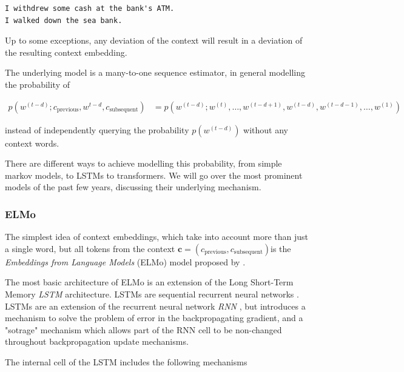 \documentclass[a4paper,12pt,twoside,openright]{report}
\begin{document}
\begin{verbatim}
I withdrew some cash at the bank's ATM.
I walked down the sea bank.
\end{verbatim}

Up to some exceptions, any deviation of the context will result in a deviation of the resulting context embedding.


The underlying model is a many-to-one sequence estimator, in general modelling the probability of 

\begin{align}
p(w^{(t-d)}; c_\text{previous}, w^{t-d}, c_\text{subsequent}) &= p(w^{(t-d)}; w^{(t)}, \ldots, w^{(t-d + 1)}, w^{(t-d)}, w^{(t-d - 1)}, \ldots, w^{(1)})
\end{align}{\label{eq:transformer_probability}}

instead of independently querying the probability $p(w^{(t-d)})$ without any context words.

There are different ways to achieve modelling this probability, from simple markov models, to LSTMs to transformers.
We will go over the most prominent models of the past few years, discussing their underlying mechanism.

\subsubsection{ELMo}

The simplest idea of context embeddings, which take into account more than just a single word, but all tokens from the context $\mathbf{c} = (c_\text{previous}, c_\text{subsequent}) $is the \textit{Embeddings from Language Models} (ELMo) model proposed by \cite{peters17b}.

The most basic architecture of ELMo is an extension of the Long Short-Term Memory \textit{LSTM} architecture.
LSTMs are sequential recurrent neural networks \cite{hochreiter97}.
LSTMs are an extension of the recurrent neural network \textit{RNN} \cite{rumelhart85}, but introduces a mechanism to solve the problem of error in the backpropagating gradient, and a "sotrage" mechanism which allows part of the RNN cell to be non-changed throughout backpropagation update mechanisms.

The internal cell of the LSTM includes the following mechanisms
\end{document}
